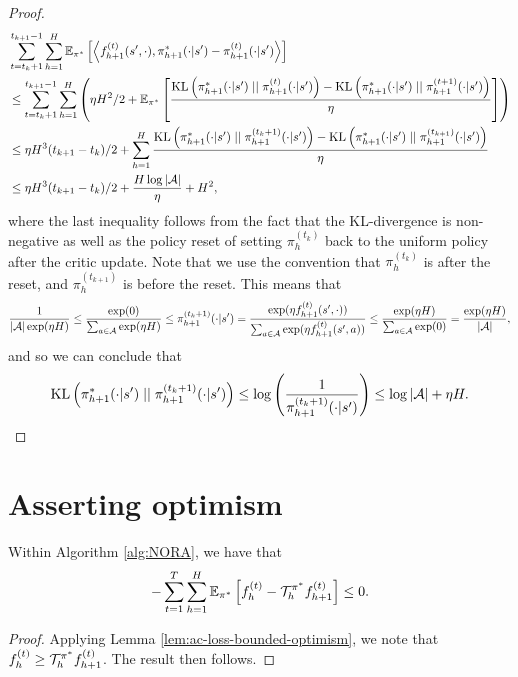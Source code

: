 \begin{proof}
\begin{align}\label{eqn:mirror-alg2-5}
    &\sum_{t=t_k+1}^{t_{k+1}-1} \sum_{h=1}^H \mathbb{E}_{\pi^*}\left[\left\langle f_{h+1}^{(t)}(s', \cdot), \pi_{h+1}^{*}(\cdot | s') - \pi_{h+1}^{(t)}(\cdot | s')\right\rangle \right] \nonumber\\
    &\leq \sum_{t=t_k+1}^{t_{k+1}-1} \sum_{h=1}^H \left(\eta H^2/2 + \mathbb{E}_{\pi^*}\left[ \frac{\text{KL}\left(\pi_{h+1}^{*}(\cdot | s')\; || \;\pi_{h+1}^{(t)}(\cdot | s')\right) - \text{KL}\left(\pi_{h+1}^{*}(\cdot | s')\; || \;\pi_{h+1}^{(t+1)}(\cdot | s')\right)}{\eta} \right]\right) \nonumber\\
    &\leq \eta H^3 (t_{k+1} - t_k)/2 + \sum_{h=1}^H \frac{\text{KL}\left(\pi_{h+1}^{*}(\cdot | s')\; || \;\pi_{h+1}^{(t_k+1)}(\cdot | s')\right) - \text{KL}\left(\pi_{h+1}^{*}(\cdot | s')\; || \;\pi_{h+1}^{(t_{k+1})}(\cdot | s')\right)}{\eta}\nonumber\\
    &\leq \eta H^3 (t_{k+1} - t_k)/2 + \frac{H \log |{\mathcal{A}}|}{\eta} + H^2,
\end{align}
where the last inequality follows from the fact that the KL-divergence is non-negative as well as the policy reset of setting $\pi_h^{(t_k)}$ back to the uniform policy after the critic update. Note that we use the convention that $\pi_h^{(t_k)}$ is after the reset, and $\pi_h^{(t_{k+1})}$ is before the reset. This means that
$$\frac{1}{|{\mathcal{A}}|\exp(\eta H)} \leq \frac{\exp(0)}{\sum_{a \in {\mathcal{A}}}\exp(\eta H)} \leq \pi_{h+1}^{(t_k+1)}(\cdot | s') = \frac{ \exp(\eta f_{h+1}^{(t)}(s', \cdot))}{\sum_{a \in {\mathcal{A}}}\exp(\eta f_{h+1}^{(t)}(s', a))} \leq \frac{\exp(\eta H)}{\sum_{a \in {\mathcal{A}}} \exp(0)} = \frac{\exp(\eta H)}{|{\mathcal{A}}|},$$
and so we can conclude that
\begin{align}\text{KL}\left(\pi_{h+1}^{*}(\cdot | s')\; || \;\pi_{h+1}^{(t_k+1)}(\cdot | s')\right) \leq \log\left(\frac{1}{\pi_{h+1}^{(t_k+1)}(\cdot | s')}\right) \leq \log|{\mathcal{A}}| + \eta H.\end{align}
\end{proof}

\section{Asserting optimism}

\begin{lem}
    Within Algorithm \ref{alg:NORA}, we have that
    $$-\sum_{t=1}^T \sum_{h=1}^H\mathbb{E}_{\pi^*}\left[f_h^{(t)} - {\mathcal{T}}_h^{\pi^{*}} f_{h+1}^{(t)} \right]  \leq 0.$$
    \label{lem:negative-bellman-decomp}
\end{lem}
\begin{proof}
Applying Lemma \ref{lem:ac-loss-bounded-optimism}, we note that $f_h^{(t)} \geq {\mathcal{T}}_h^{\pi^{*}} f_{h+1}^{(t)}$. The result then follows.
\end{proof}

